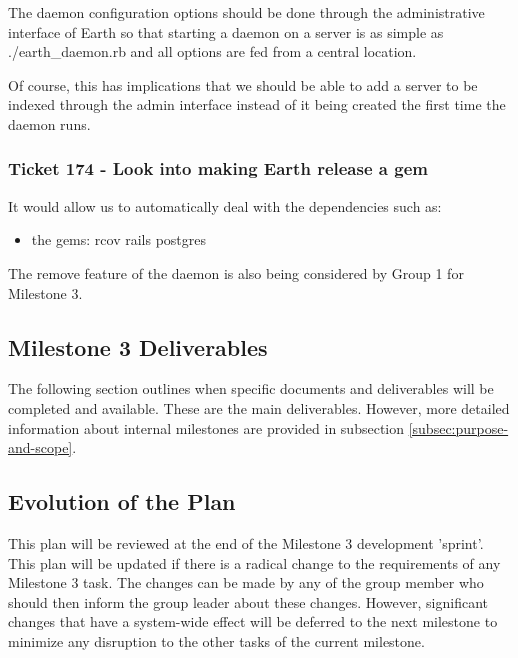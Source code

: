 \documentclass[10pt,a4,oneside]{article}
\begin{document}
The daemon configuration options should be done through the administrative interface of Earth so that 
starting a daemon on a server is as simple as ./earth\_daemon.rb and all options are fed from a central location.

\noindent Of course, this has implications that we should be able to add a server to be indexed through the admin 
interface instead of it being created the first time the daemon runs. 


\subsubsection*{ Ticket 174 - Look into making Earth release a gem}

It would allow us to automatically deal with the dependencies such as:



\begin{itemize}
\item the gems:
  \subitem rcov
  \subitem rails
  \subitem postgres 
\end{itemize}
 
The remove feature of the daemon is also being considered by Group 1 for Milestone 3. 

 
\subsection{Milestone 3 Deliverables}
 
The following section outlines when specific documents and deliverables will be 
completed and available. These are the main deliverables. However, more detailed 
information about internal milestones are provided in subsection \ref{subsec:purpose-and-scope}.
 
\subsection{Evolution of the Plan}
 
This plan will be reviewed at the end of the Milestone 3 development 'sprint'. This plan 
will be updated if there is a radical change to the requirements of any Milestone 3 task. 
The changes can be made by any of the group member who should then inform the group leader 
about these changes. However, significant changes that have a system-wide effect will be deferred 
to the next milestone to minimize any disruption to the other tasks of the current milestone.

\newpage
\end{document}
